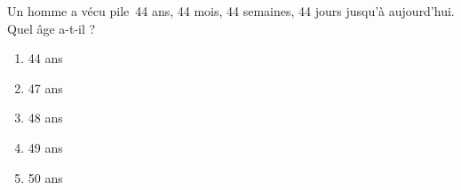 Un homme a vécu \og pile\fg\ 44 ans, 44 mois, 44 semaines, 44 jours
jusqu'à aujourd'hui. Quel âge a-t-il ?
\begin{multicols}{5}
  \begin{enumerate}[A/]
  \item 44 ans
  \item 47 ans
  \item 48 ans
  \item 49 ans
  \item 50 ans
  \end{enumerate}
\end{multicols}